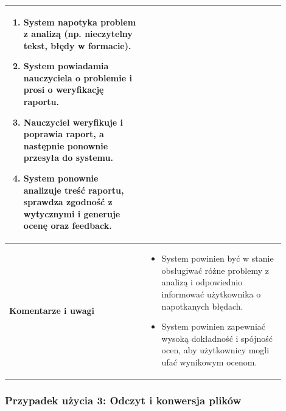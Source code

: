 \documentclass[a4paper, 12pt]{article}
\begin{document}
\begin{center}
\begin{longtable}{|p{0.45\linewidth}|p{0.45\linewidth}|}
\begin{enumerate}
    \item System napotyka problem z analizą (np. nieczytelny tekst, błędy w formacie).
    \item System powiadamia nauczyciela o problemie i prosi o weryfikację raportu.
    \item Nauczyciel weryfikuje i poprawia raport, a następnie ponownie przesyła do systemu.
    \item System ponownie analizuje treść raportu, sprawdza zgodność z wytycznymi i generuje ocenę oraz feedback.
\end{enumerate} \\
\hline
\textbf{Komentarze i uwagi} &
\begin{itemize}
    \item System powinien być w stanie obsługiwać różne problemy z analizą i odpowiednio informować użytkownika o napotkanych błędach.
    \item System powinien zapewniać wysoką dokładność i spójność ocen, aby użytkownicy mogli ufać wynikowym ocenom.
\end{itemize} \\
\hline
\end{longtable}
\end{center}

\subsubsection*{Przypadek użycia 3: Odczyt i konwersja plików}
\end{document}
